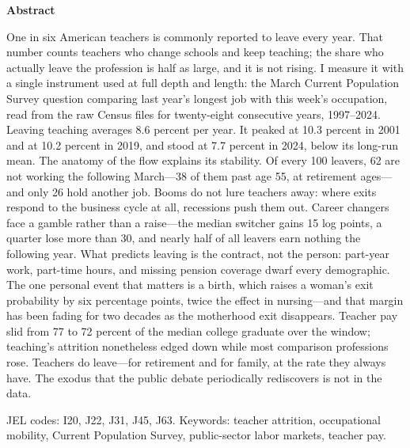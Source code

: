 \documentclass[11pt,a4paper]{article}
\begin{document}
\vspace{22pt}
\begin{center}
\begin{minipage}{0.86\textwidth}
{\fontsize{10.5}{14.5}\selectfont
\begin{center}\bfseries Abstract\end{center}\vspace{2pt}
One in six American teachers is commonly reported to leave every year.
That number counts teachers who change schools and keep teaching; the
share who actually leave the profession is half as large, and it is not
rising. I measure it with a single instrument used at full depth and
length: the March Current Population Survey question comparing last
year's longest job with this week's occupation, read from the raw
Census files for twenty-eight consecutive years, 1997--2024. Leaving
teaching averages 8.6 percent per year. It peaked at 10.3 percent in
2001 and at 10.2 percent in 2019, and stood at 7.7 percent in 2024,
below its long-run mean. The anatomy of the flow explains its
stability. Of every 100 leavers, 62 are not working the following
March---38 of them past age 55, at retirement ages---and only 26 hold
another job. Booms do not lure teachers away: where exits respond to
the business cycle at all, recessions push them out. Career changers
face a gamble rather than a raise---the median switcher gains 15 log
points, a quarter lose more than 30, and nearly half of all leavers
earn nothing the following year. What predicts leaving is the contract,
not the person: part-year work, part-time hours, and missing pension
coverage dwarf every demographic. The one personal event that matters
is a birth, which raises a woman's exit probability by six percentage
points, twice the effect in nursing---and that margin has been fading
for two decades as the motherhood exit disappears. Teacher pay slid
from 77 to 72 percent of the median college graduate over the window;
teaching's attrition nonetheless edged down while most comparison
professions rose. Teachers do leave---for retirement and for family,
at the rate they always have. The exodus that the public debate
periodically rediscovers is not in the data.}
\end{minipage}
\end{center}

\vspace{10pt}
\begin{center}\begin{minipage}{0.86\textwidth}\small
JEL codes: I20, J22, J31, J45, J63.\quad
Keywords: teacher attrition, occupational mobility, Current
Population Survey, public-sector labor markets, teacher pay.
\end{minipage}\end{center}
\end{document}
